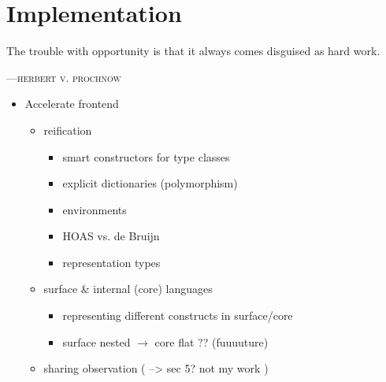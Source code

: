 
\chapter{Implementation}
\epigraph{The trouble with opportunity is that it always comes disguised as hard work.}%
{\textsc{---herbert v. prochnow}}

\begin{itemize}
    \item Accelerate frontend
        \begin{itemize}
            \item reification
                \begin{itemize}
                    \item smart constructors for type classes
                    \item explicit dictionaries (polymorphism)
                    \item environments
                    \item HOAS vs. de Bruijn
                    \item representation types
                \end{itemize}
            \item surface \& internal (core) languages
                \begin{itemize}
                    \item representing different constructs in surface/core
                    \item surface nested $\rightarrow$ core flat ?? (fuuuuture)
                \end{itemize}
            \item sharing observation ( --> sec 5? not my work )
        \end{itemize}


\end{itemize}
